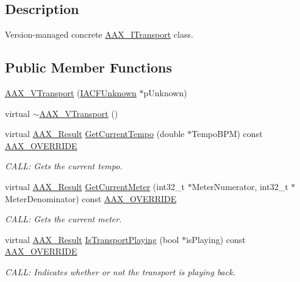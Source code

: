 \subsection{Description}
Version-\/managed concrete \hyperlink{a00116}{A\+A\+X\+\_\+\+I\+Transport} class. \subsection*{Public Member Functions}
\begin{DoxyCompactItemize}
\item 
\hyperlink{a00141_a8ce1b37bff86703b1aa542917dbe4bf9}{A\+A\+X\+\_\+\+V\+Transport} (\hyperlink{a00146}{I\+A\+C\+F\+Unknown} $\ast$p\+Unknown)
\item 
virtual \hyperlink{a00141_a27b1969a2cbeffc07428764de06ed7b2}{$\sim$\+A\+A\+X\+\_\+\+V\+Transport} ()
\item 
virtual \hyperlink{a00149_a4d8f69a697df7f70c3a8e9b8ee130d2f}{A\+A\+X\+\_\+\+Result} \hyperlink{a00141_a05d58538fee97c657cf19eb39406323c}{Get\+Current\+Tempo} (double $\ast$Tempo\+B\+P\+M) const \hyperlink{a00149_ac2f24a5172689ae684344abdcce55463}{A\+A\+X\+\_\+\+O\+V\+E\+R\+R\+I\+D\+E}
\begin{DoxyCompactList}\small\item\em C\+A\+L\+L\+: Gets the current tempo. \end{DoxyCompactList}\item 
virtual \hyperlink{a00149_a4d8f69a697df7f70c3a8e9b8ee130d2f}{A\+A\+X\+\_\+\+Result} \hyperlink{a00141_a14761327ca210794fd74e91589f85b60}{Get\+Current\+Meter} (int32\+\_\+t $\ast$Meter\+Numerator, int32\+\_\+t $\ast$Meter\+Denominator) const \hyperlink{a00149_ac2f24a5172689ae684344abdcce55463}{A\+A\+X\+\_\+\+O\+V\+E\+R\+R\+I\+D\+E}
\begin{DoxyCompactList}\small\item\em C\+A\+L\+L\+: Gets the current meter. \end{DoxyCompactList}\item 
virtual \hyperlink{a00149_a4d8f69a697df7f70c3a8e9b8ee130d2f}{A\+A\+X\+\_\+\+Result} \hyperlink{a00141_a0bc78c47dbc548a1d51bd19addf7b08c}{Is\+Transport\+Playing} (bool $\ast$is\+Playing) const \hyperlink{a00149_ac2f24a5172689ae684344abdcce55463}{A\+A\+X\+\_\+\+O\+V\+E\+R\+R\+I\+D\+E}
\begin{DoxyCompactList}\small\item\em C\+A\+L\+L\+: Indicates whether or not the transport is playing back. \end{DoxyCompactList}\item 

\end{DoxyCompactItemize}
